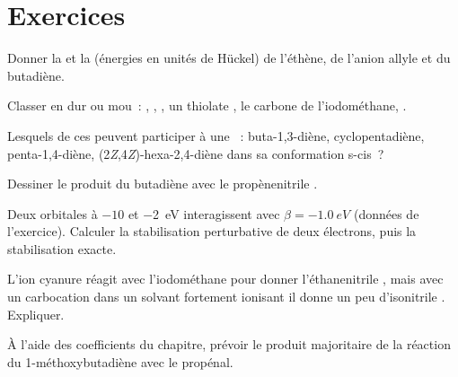 \section{Exercices}

\begin{exercise}[$\star$]\label{exo:b2:frontier-orbitals:1}
Donner la  et la  (énergies en unités de Hückel) de l'éthène, de l'anion allyle
et du butadiène.
\end{exercise}

\begin{exercise}[$\star$]\label{exo:b2:frontier-orbitals:2}
Classer en dur ou mou~: , , , un thiolate , le carbone de
l'iodométhane, .
\end{exercise}

\begin{exercise}[$\star$]\label{exo:b2:frontier-orbitals:3}
Lesquels de ces  peuvent participer à une ~: buta-1,3-diène,
cyclopentadiène, penta-1,4-diène, (2\textit{Z},4\textit{Z})-hexa-2,4-diène dans sa conformation
s-cis~?
\end{exercise}

\begin{exercise}[$\star$]\label{exo:b2:frontier-orbitals:4}
Dessiner le produit du butadiène avec le propènenitrile .
\end{exercise}

\begin{exercise}[$\star\star$]\label{exo:b2:frontier-orbitals:5}
Deux orbitales à $-10$ et \qty{-2}{eV} interagissent avec $\beta = \qty{-1.0}{eV}$ (données de l'exercice).
Calculer la stabilisation perturbative de deux électrons, puis la stabilisation exacte.
\end{exercise}

\begin{exercise}[$\star\star$]\label{exo:b2:frontier-orbitals:6}
L'ion cyanure réagit avec l'iodométhane pour donner l'éthanenitrile , mais avec un
carbocation dans un solvant fortement ionisant il donne un peu d'isonitrile . Expliquer.
\end{exercise}

\begin{exercise}[$\star\star$]\label{exo:b2:frontier-orbitals:7}
À l'aide des coefficients du chapitre, prévoir le produit majoritaire de la réaction du 1-méthoxybutadiène
avec le propénal.
\end{exercise}

